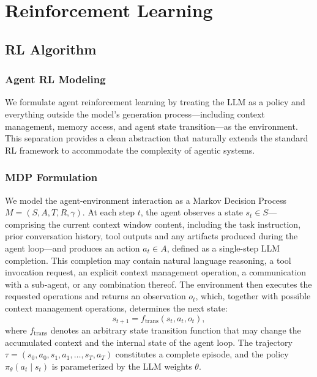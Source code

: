 \section{Reinforcement Learning}
\label{sec:rl}

\subsection{RL Algorithm}

\subsubsection{Agent RL Modeling}

We formulate agent reinforcement learning by treating the LLM as a policy and everything outside the model's generation process---including context management, memory access, and agent state transition---as the environment. This separation provides a clean abstraction that naturally extends the standard RL framework to accommodate the complexity of agentic systems.

\subsubsection{MDP Formulation}

We model the agent-environment interaction as a Markov Decision Process $M = (S, A, T, R, \gamma)$. At each step $t$, the agent observes a state $s_t \in S$---comprising the current context window content, including the task instruction, prior conversation history, tool outputs and any artifacts produced during the agent loop---and produces an action $a_t \in A$, defined as a single-step LLM completion. This completion may contain natural language reasoning, a tool invocation request, an explicit context management operation, a communication with a sub-agent, or any combination thereof. The environment then executes the requested operations and returns an observation $o_t$, which, together with possible context management operations, determines the next state:
\begin{equation}
s_{t+1} = f_{\text{trans}}(s_t, a_t, o_t),
\end{equation}
where $f_{\text{trans}}$ denotes an arbitrary state transition function that may change the accumulated context and the internal state of the agent loop. The trajectory $\tau = (s_0, a_0, s_1, a_1, \ldots, s_T, a_T)$ constitutes a complete episode, and the policy $\pi_\theta(a_t \mid s_t)$ is parameterized by the LLM weights $\theta$.


